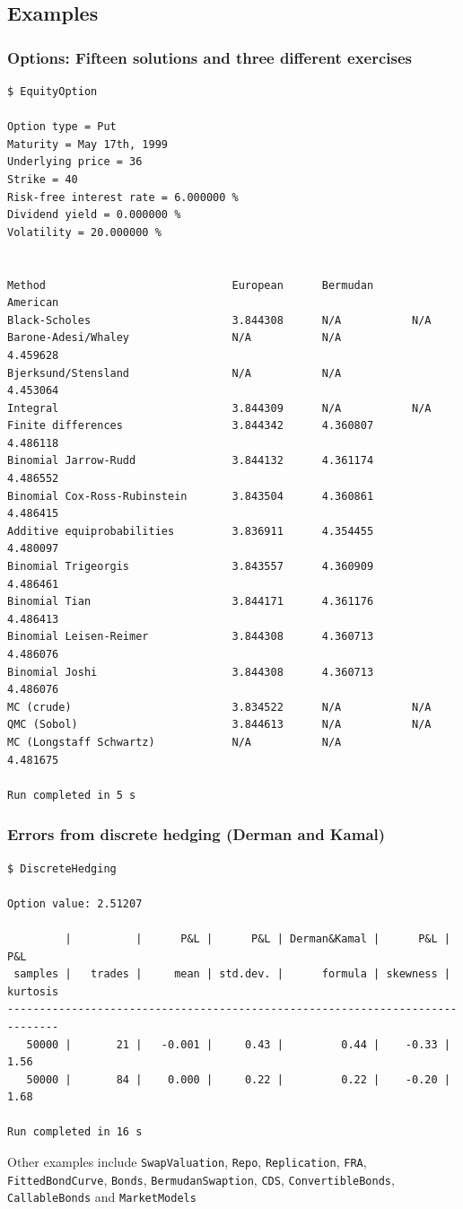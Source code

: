 \documentclass[compress]{beamer}
\begin{document}
\subsection{Examples}
\begin{frame}[fragile]
  \frametitle{Options: Fifteen solutions and three different exercises}
\tiny
  \begin{verbatim}
$ EquityOption

Option type = Put
Maturity = May 17th, 1999
Underlying price = 36
Strike = 40
Risk-free interest rate = 6.000000 %
Dividend yield = 0.000000 %
Volatility = 20.000000 %


Method                             European      Bermudan      American
Black-Scholes                      3.844308      N/A           N/A
Barone-Adesi/Whaley                N/A           N/A           4.459628
Bjerksund/Stensland                N/A           N/A           4.453064
Integral                           3.844309      N/A           N/A
Finite differences                 3.844342      4.360807      4.486118
Binomial Jarrow-Rudd               3.844132      4.361174      4.486552
Binomial Cox-Ross-Rubinstein       3.843504      4.360861      4.486415
Additive equiprobabilities         3.836911      4.354455      4.480097
Binomial Trigeorgis                3.843557      4.360909      4.486461
Binomial Tian                      3.844171      4.361176      4.486413
Binomial Leisen-Reimer             3.844308      4.360713      4.486076
Binomial Joshi                     3.844308      4.360713      4.486076
MC (crude)                         3.834522      N/A           N/A
QMC (Sobol)                        3.844613      N/A           N/A
MC (Longstaff Schwartz)            N/A           N/A           4.481675

Run completed in 5 s

  \end{verbatim}
\end{frame}

\begin{frame}[fragile]
  \frametitle{Errors from discrete hedging (Derman and Kamal)}
{ \tiny
  \begin{verbatim}
$ DiscreteHedging

Option value: 2.51207

         |          |      P&L |      P&L | Derman&Kamal |      P&L |      P&L
 samples |   trades |     mean | std.dev. |      formula | skewness | kurtosis
------------------------------------------------------------------------------
   50000 |       21 |   -0.001 |     0.43 |         0.44 |    -0.33 |     1.56
   50000 |       84 |    0.000 |     0.22 |         0.22 |    -0.20 |     1.68

Run completed in 16 s
  \end{verbatim}
}

Other examples include \texttt{SwapValuation}, \texttt{Repo},
\texttt{Replication}, \texttt{FRA}, \texttt{FittedBondCurve}, \texttt{Bonds},
\texttt{BermudanSwaption}, \texttt{CDS}, \texttt{ConvertibleBonds},
\texttt{CallableBonds} and \texttt{MarketModels}

\end{frame}
\end{document}
